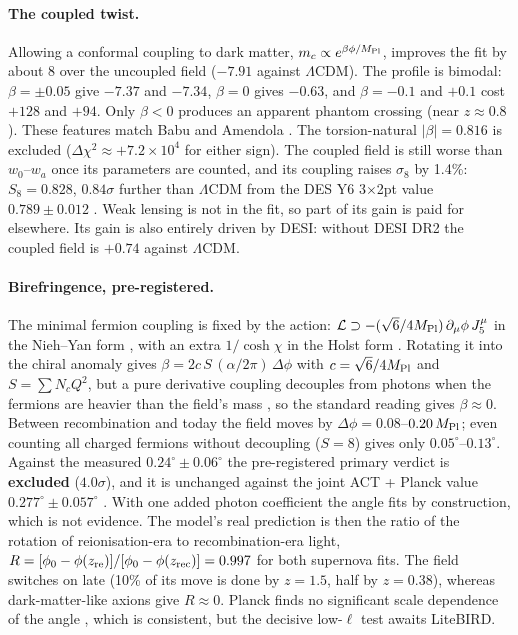 \documentclass[11pt]{article}
\newcommand{\Mp}{M_{\rm Pl}}
\begin{document}
\paragraph{The coupled twist.} Allowing a conformal coupling to dark matter, $m_c\propto e^{\beta\phi/\Mp}$, improves
the fit by about 8 over the uncoupled field ($-7.91$ against $\Lambda$CDM). The profile is bimodal: $\beta=\pm0.05$
give $-7.37$ and $-7.34$, $\beta=0$ gives $-0.63$, and $\beta=-0.1$ and $+0.1$ cost $+128$ and $+94$. Only $\beta<0$
produces an apparent phantom crossing (near $z\approx0.8$). These features match Babu and Amendola \cite{babu2026}.
The torsion-natural $|\beta|=0.816$ is excluded ($\Delta\chi^2\approx+7.2\times10^4$ for either sign). The coupled
field is still worse than $w_0$--$w_a$ once its parameters are counted, and its coupling raises $\sigma_8$ by 1.4\%:
$S_8=0.828$, $0.84\sigma$ further than $\Lambda$CDM from the DES Y6 3$\times$2pt value $0.789\pm0.012$
\cite{desy6}. Weak lensing is not in the fit, so part of its gain is paid for elsewhere. Its gain is also entirely
driven by DESI: without DESI DR2 the coupled field is $+0.74$ against $\Lambda$CDM.

\paragraph{Birefringence, pre-registered.} The minimal fermion coupling is fixed by the action:
$\mathcal L\supset-(\sqrt6/4\Mp)\,\partial_\mu\phi\,J_5^\mu$ in the Nieh--Yan form \cite{mercuri2009}, with an extra
$1/\cosh\chi$ in the Holst form \cite{torresgomez2009}. Rotating it into the chiral anomaly gives
$\beta=2c\,S\,(\alpha/2\pi)\,\Delta\phi$ with $c=\sqrt6/4\Mp$ and $S=\sum N_cQ^2$, but a pure derivative coupling
decouples from photons when the fermions are heavier than the field's mass \cite{bauer2017}, so the standard reading
gives $\beta\approx0$. Between recombination and today the field moves by $\Delta\phi=0.08$--$0.20\,\Mp$; even counting
all charged fermions without decoupling ($S=8$) gives only $0.05^\circ$--$0.13^\circ$. Against the measured
$0.24^\circ\pm0.06^\circ$ the pre-registered primary verdict is \textbf{excluded} ($4.0\sigma$), and it is unchanged
against the joint ACT + Planck value $0.277^\circ\pm0.057^\circ$ \cite{eskilt2026}. With one added photon coefficient
the angle fits by construction, which is not evidence. The model's real prediction is then the ratio of the rotation
of reionisation-era to recombination-era light, $R=[\phi_0-\phi(z_{\rm re})]/[\phi_0-\phi(z_{\rm rec})]=0.997$ for
both supernova fits. The field switches on late (10\% of its move is done by $z=1.5$, half by $z=0.38$), whereas
dark-matter-like axions give $R\approx0$. Planck finds no significant scale dependence of the angle
\cite{ballardini2025}, which is consistent, but the decisive low-$\ell$ test awaits LiteBIRD.
\end{document}
